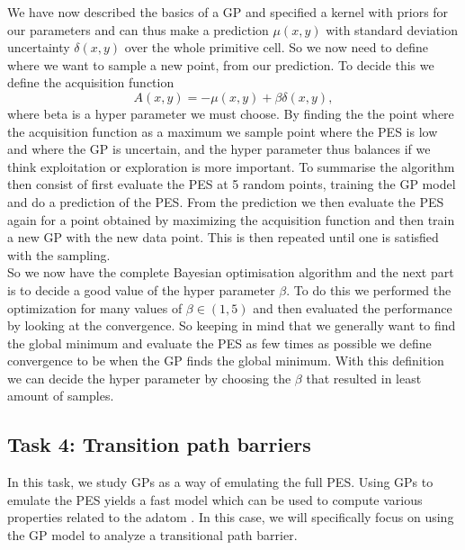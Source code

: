 \documentclass[11pt,a4paper]{article}
\begin{document}
We have now described the basics of a GP and specified a kernel with priors for our parameters and can thus make a prediction $\mu(x,y)$ with standard deviation uncertainty $\delta(x,y)$ over the whole primitive cell. So we now need to define where we want to sample a new point, from our prediction. To decide this we define the acquisition function
\begin{equation*}
    A(x,y) = -\mu(x,y) + \beta \delta(x,y),
\end{equation*}
where beta is a hyper parameter we must choose. By finding the the point where the acquisition function as a maximum we sample point where the PES is low and where the GP is uncertain, and the hyper parameter thus balances if we think exploitation or exploration is more important. To summarise the algorithm then consist of first evaluate the PES at 5 random points, training the GP model and do a prediction of the PES. From the prediction we then evaluate the PES again for a point obtained by maximizing the acquisition function and then train a new GP with the new data point. This is then repeated until one is satisfied with the sampling.  
\\

So we now have the complete Bayesian optimisation algorithm and the next part is to decide a good value of the hyper parameter $\beta$. To do this we performed the optimization for many values of $\beta \in (1,5)$ and then evaluated the performance by looking at the convergence. So keeping in mind that we generally want to find the global minimum and evaluate the PES as few times as possible we define convergence to be when the GP finds the global minimum. With this definition we can decide the hyper parameter by choosing the $\beta$ that resulted in least amount of samples. 





















\subsection[Task 4]{Task 4: Transition path barriers}
\label{sec:method_task4}

In this task, we study GPs as a way of emulating the full PES. Using GPs to emulate the PES yields a fast model which can be used to compute various properties related to the adatom \cite{project_pm}. In this case, we will specifically focus on using the GP model to analyze a transitional path barrier. 
\end{document}
